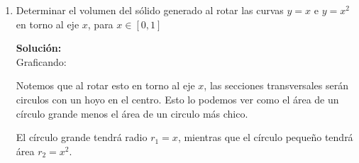 \documentclass[12pt]{article}
\newenvironment{solucion}
{\begin{mdframed}[backgroundcolor=black!10]
		{\bf Solución:}\\
	}
	{
	\end{mdframed}
}
\newenvironment{preguntas}
{\begin{enumerate}\itemsep12pt
	}
	{
	\end{enumerate}
}
\newcommand{\ev}{\Big|}
\begin{document}
\begin{preguntas}
\begin{solucion}
		Como integraremos en el eje $x$, necesitamos el cateto del triángulo en función de $y$. Es decir, despejando en la ecuación del círculo,
		$$y = \sqrt[]{a^2-x^2}$$
		Como este es el catéto y nuestro triángulo es rectángulo isóceles, sabemos que su área será
		$$A =  \dfrac{(\sqrt[]{a^2-x^2})^2}{2} = \dfrac{a^2-x^2}{2}$$
		Luego,
		$$dV = \dfrac{a^2-x^2}{2} dx$$
		Finalmente, el volumen es
		$$V = 4 \displaystyle \int_0^a \dfrac{a^2-x^2}{2} dx = 4\left(\dfrac{a^2x}{2} - \dfrac{x^3}{6}\right) \ev_0^a = 4\left(\dfrac{a^3}{2} - \dfrac{a^3}{6}\right) = 4\left(\dfrac{2a^3}{6}\right) = \dfrac{4}{3}a^3$$
\end{solucion}
\item Determinar el volumen del sólido generado al rotar las curvas $y=x$ e $y= x^2$ en torno al eje $x$, para $x \in [0,1]$
\begin{solucion}
Graficando:
		\begin{center}
		\end{center}
		
		Notemos que al rotar esto en torno al eje $x$, las secciones transversales serán circulos con un hoyo en el centro. Esto lo podemos ver como el área de un círculo grande menos el área de un circulo más chico.
		
		El círculo grande tendrá radio $r_1 = x$, mientras que el círculo pequeño tendrá área $r_2 = x^2$. 
		

\end{solucion}
\end{preguntas}
\end{document}
